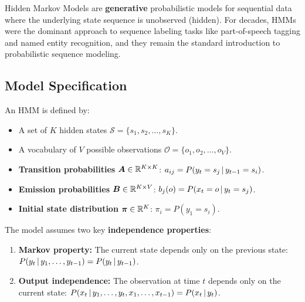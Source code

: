 Hidden Markov Models are \textbf{generative} probabilistic models for
sequential data where the underlying state sequence is unobserved (hidden).
For decades, HMMs were the dominant approach to sequence labeling tasks like
part-of-speech tagging and named entity recognition, and they remain the
standard introduction to probabilistic sequence modeling.

\subsection{Model Specification}

An HMM is defined by:

\begin{itemize}
    \item A set of $K$ hidden states $\mathcal{S} = \{s_1, s_2, \ldots, s_K\}$.
    \item A vocabulary of $V$ possible observations $\mathcal{O} = \{o_1, o_2, \ldots, o_V\}$.
    \item \textbf{Transition probabilities} $\bm{A} \in \mathbb{R}^{K \times K}$:
          $a_{ij} = P(y_t = s_j \,|\, y_{t-1} = s_i)$.
    \item \textbf{Emission probabilities} $\bm{B} \in \mathbb{R}^{K \times V}$:
          $b_j(o) = P(x_t = o \,|\, y_t = s_j)$.
    \item \textbf{Initial state distribution} $\bm{\pi} \in \mathbb{R}^K$:
          $\pi_i = P(y_1 = s_i)$.
\end{itemize}

The model assumes two key \textbf{independence properties}:
\begin{enumerate}
    \item \textbf{Markov property:} The current state depends only on the
          previous state: $P(y_t \,|\, y_1, \ldots, y_{t-1}) = P(y_t \,|\, y_{t-1})$.
    \item \textbf{Output independence:} The observation at time $t$ depends
          only on the current state: $P(x_t \,|\, y_1, \ldots, y_t, x_1, \ldots, x_{t-1}) = P(x_t \,|\, y_t)$.
\end{enumerate}

